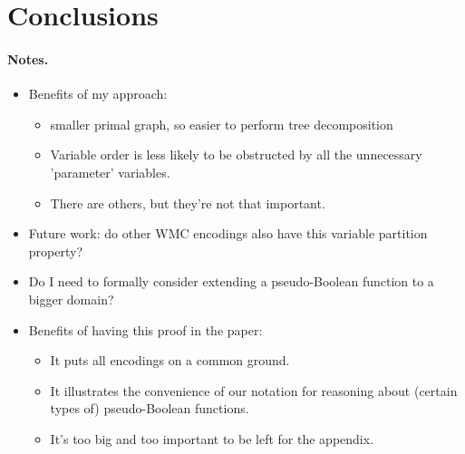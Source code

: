 \documentclass[runningheads]{llncs}
\begin{document}
\section{Conclusions}

\paragraph{Notes.}
\begin{itemize}
\item Benefits of my approach:
  \begin{itemize}
  \item smaller primal graph, so easier to perform tree decomposition
  \item Variable order is less likely to be obstructed by all the unnecessary
    'parameter' variables.
  \item There are others, but they're not that important.
  \end{itemize}
\item Future work: do other WMC encodings also have this variable partition
  property?
\item Do I need to formally consider extending a pseudo-Boolean function to a
  bigger domain?
\item Benefits of having this proof in the paper:
  \begin{itemize}
  \item It puts all encodings on a common ground.
  \item It illustrates the convenience of our notation for reasoning about
    (certain types of) pseudo-Boolean functions.
  \item It's too big and too important to be left for the appendix.
  \end{itemize}
\end{itemize}



\end{document}
